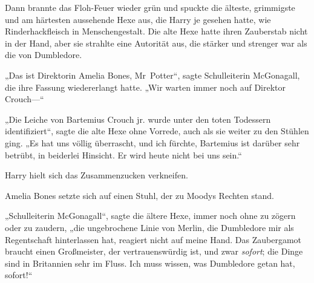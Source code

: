 Dann brannte das Floh-Feuer wieder grün und spuckte die älteste, grimmigste und am härtesten aussehende Hexe aus, die Harry je gesehen hatte, wie Rinderhackfleisch in Menschengestalt. Die alte Hexe hatte ihren Zauberstab nicht in der Hand, aber sie strahlte eine Autorität aus, die stärker und strenger war als die von Dumbledore.

„Das ist Direktorin Amelia Bones, Mr~Potter“, sagte Schulleiterin McGonagall, die ihre Fassung wiedererlangt hatte. „Wir warten immer noch auf Direktor Crouch—“

„Die Leiche von Bartemius Crouch jr. wurde unter den toten Todessern identifiziert“, sagte die alte Hexe ohne Vorrede, auch als sie weiter zu den Stühlen ging.
„Es hat uns völlig überrascht, und ich fürchte, Bartemius ist darüber sehr betrübt, in beiderlei Hinsicht. Er wird heute nicht bei uns sein.“

Harry hielt sich das Zusammenzucken verkneifen.

Amelia Bones setzte sich auf einen Stuhl, der zu Moodys Rechten stand.

„Schulleiterin McGonagall“, sagte die ältere Hexe, immer noch ohne zu zögern oder zu zaudern, „die ungebrochene Linie von Merlin, die Dumbledore mir als Regentschaft hinterlassen hat, reagiert nicht auf meine Hand. Das Zaubergamot braucht einen Großmeister, der vertrauenswürdig ist, und zwar \emph{sofort}; die Dinge sind in Britannien sehr im Fluss. Ich muss wissen, was Dumbledore getan hat, sofort!“

